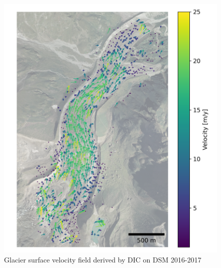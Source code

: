 \begin{figure}
    \centering
    \includegraphics[height=\textheight]{figures/chapter3/velocity_DIC_2016-2017.png}
    \caption{Glacier surface velocity field derived by DIC on DSM 2016-2017}
\end{figure}

